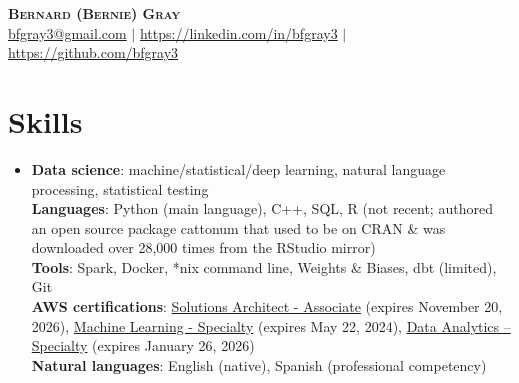 \documentclass[letterpaper,11pt]{article}
\begin{document}
\begin{center}
    \textbf{\Huge \scshape Bernard (Bernie) Gray} \\ \vspace{1pt}
    \href{mailto:bfgray3@gmail.com}{bfgray3@gmail.com} $|$
    \url{https://linkedin.com/in/bfgray3} $|$
    \url{https://github.com/bfgray3}
\end{center}

\section{Skills}
\begin{itemize}[leftmargin=0.15in, label={}]
    \item{
     \textbf{Data science}{: machine/statistical/deep learning, natural language processing, statistical testing} \\
     \textbf{Languages}{: Python (main language), C++, SQL, R (not recent; authored an open source package cattonum that used to be on CRAN \& was downloaded over 28,000 times from the RStudio mirror)} \\
     \textbf{Tools}{: Spark, Docker, *nix command line, Weights \& Biases, dbt (limited), Git} \\
     \textbf{AWS certifications}{: \href{https://www.credly.com/badges/d15d58be-270e-4b5e-b9cf-301d16c45d74}{Solutions Architect - Associate} (expires November 20, 2026), \href{https://www.credly.com/badges/4adc2428-4a38-4f95-a473-7a1571da7b28}{Machine Learning - Specialty} (expires May 22, 2024), \href{https://www.credly.com/badges/23d07045-d56a-4626-99f8-f0815c7d0e6b}{Data Analytics – Specialty} (expires January 26, 2026)} \\
     \textbf{Natural languages}{: English (native), Spanish (professional competency)}
}
 \end{itemize}
\end{document}
